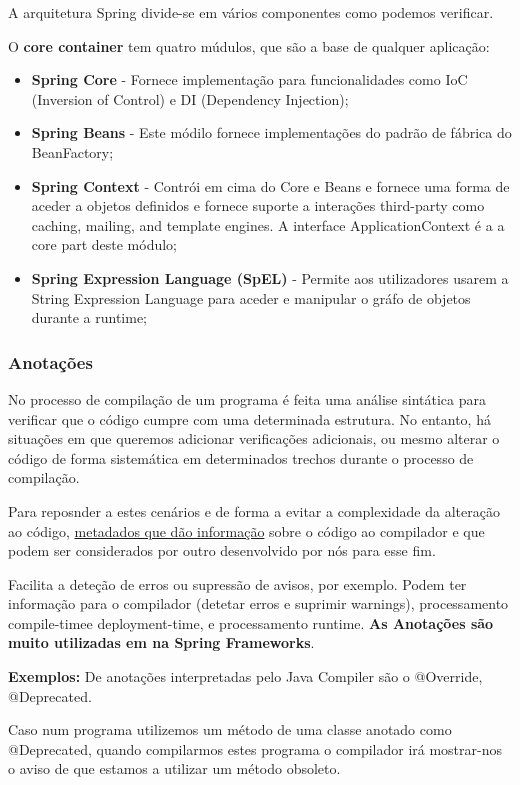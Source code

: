 \documentclass{article}
\begin{document}
A arquitetura Spring divide-se em vários componentes como podemos verificar.


\pagebreak

O \textbf{core container} tem quatro múdulos, que são a base de qualquer
aplicação:
\begin{itemize}
  \item \textbf{Spring Core} - Fornece implementação para funcionalidades
  como IoC (Inversion of Control) e DI (Dependency Injection);
  \item \textbf{Spring Beans} - Este módilo fornece implementações do padrão de fábrica
  do BeanFactory;
  \item \textbf{Spring Context} - Contrói em cima do Core e Beans e fornece
  uma forma de aceder a objetos definidos e fornece suporte a interações
  third-party como caching, mailing, and template engines. A interface ApplicationContext é a
  a core part deste módulo;
  \item \textbf{Spring Expression Language (SpEL)} - Permite aos utilizadores
  usarem a String Expression Language para aceder e manipular o gráfo de
  objetos durante a runtime;
\end{itemize}

\subsubsection{Anotações}

No processo de compilação de um programa é feita uma análise sintática para verificar que o
código cumpre com uma determinada estrutura. No entanto, há situações em que queremos
adicionar verificações adicionais, ou mesmo alterar o código de forma sistemática em
determinados trechos durante o processo de compilação.

\vspace{2mm}

Para reposnder a estes cenários e de forma a evitar a complexidade da
alteração ao código, \uline{metadados que dão informação} sobre o código ao compilador
e que podem ser considerados por outro desenvolvido por nós para esse fim.

Facilita a deteção de erros ou supressão de avisos, por exemplo. Podem
ter informação para o compilador (detetar erros e suprimir warnings),
processamento compile-timee deployment-time, e processamento runtime.
\textbf{As Anotações são muito utilizadas em na Spring Frameworks}.

\begin{flushleft}
  \textbf{Exemplos:}  De anotações interpretadas pelo Java Compiler são o @Override, @Deprecated.

  Caso num programa utilizemos um método de uma classe anotado como @Deprecated, quando compilarmos estes
  programa o compilador irá mostrar-nos o aviso de que estamos a utilizar um método obsoleto.
\end{flushleft}
\end{document}
